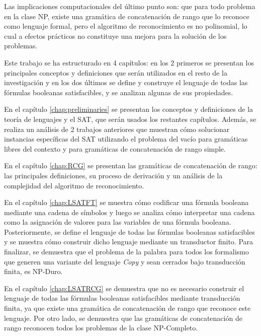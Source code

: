 \documentclass[12pt]{article}
\begin{document}
Las implicaciones computacionales del último punto son: que para todo problema en la clase NP, existe una gramática
de concatenación de rango que lo reconoce como lenguaje formal, pero el algoritmo de reconocimiento es no 
polinomial, lo cual a efectos prácticos no constituye una mejora para la solución de los problemas.

Este trabajo se ha estructurado en 4 capítulos: en los 2 primeros se presentan los principales conceptos y 
definiciones que serán utilizados en el resto de la investigación y en los dos últimos se define y construye 
el lenguaje de todas las fórmulas booleanas satisfacibles, y se analizan algunas de sus propiedades.

En el capítulo \ref{chap:preliminaries} se presentan los conceptos y definiciones de la teoría de lenguajes y 
el SAT, que serán usados los restantes capítulos. Además, se realiza un análisis de 2 trabajos anteriores 
que muestran cómo solucionar instancias específicas del SAT utilizando el problema del vacío para gramáticas 
libres del contexto y para gramáticas de concatenación de rango simple.

En el capítulo \ref{chap:RCG} se presentan las gramáticas de concatenación de rango: las principales definiciones, 
su proceso de derivación y un análisis de la complejidad del algoritmo de reconocimiento.

En el capítulo \ref{chap:LSATFT} se muestra cómo codificar una fórmula booleana mediante una cadena de símbolos 
y luego se analiza cómo interpretar una cadena como la asignación de valores para las variables de una fórmula 
booleana.  Posteriormente, se define el lenguaje de todas las fórmulas booleanas satisfacibles y se muestra 
cómo construir dicho lenguaje mediante un transductor finito. Para finalizar, se demuestra que el problema de 
la palabra para todos los formalismo que generen una variante del lenguaje \textit{Copy} y sean cerrados bajo
transducción finita, es NP-Duro.

En el capítulo \ref{chap:LSATRCG} se demuestra que no es necesario construir el lenguaje de todas las 
fórmulas booleanas satisfacibles mediante transducción finita, ya que existe una gramática de concatenación 
de rango que reconoce este lenguaje. Por otro lado, se demuestra que las gramáticas de concatenación de rango 
reconocen todos los problemas de la clase NP-Completo.
\end{document}
